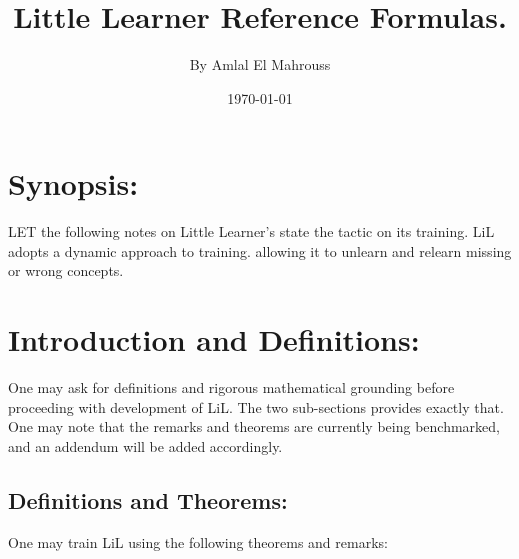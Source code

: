 \documentclass[10pt]{article}
\title{%
	\vspace{-1.5em}%
	\large\textbf{Little Learner Reference Formulas.}%
}
\author{By Amlal El Mahrouss}
\date{\today}
\theoremstyle{plain}
\theoremstyle{definition}
\theoremstyle{remark}
\begin{document}

\maketitle
\tableofcontents
\newpage

\section{Synopsis:}

\lettrine[lines=1, lhang=0.1, loversize=0.2]{L}ET the following notes on Little Learner's state the tactic on its training. LiL adopts a dynamic approach to training. allowing it to unlearn and relearn missing or wrong concepts.

\section{Introduction and Definitions:}

One may ask for definitions and rigorous mathematical grounding before proceeding with development of LiL. The two sub-sections provides exactly that.\\
One may note that the remarks and theorems are currently being benchmarked, and an addendum will be added accordingly.

\subsection{Definitions and Theorems:}

One may train LiL using the following theorems and remarks:
\end{document}
